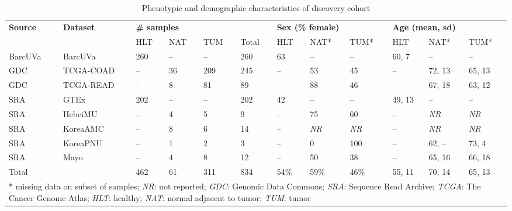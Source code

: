 \begin{table}[ht]
    \small
    \centering
    \caption{Phenotypic and demographic characteristics of discovery cohort}
    \label{tab:discovery}
    \begin{tabular}{ll|llll|lll|lll}
        \textbf{Source} & \textbf{Dataset} & \multicolumn{4}{l|}{\textbf{\# samples}} & \multicolumn{3}{l|}{\textbf{Sex (\% female)}} & \multicolumn{3}{l}{\textbf{Age (mean, sd)}} \\
        \cline{3-12}
         & & HLT & NAT & TUM & Total & HLT & NAT* & TUM* & HLT & NAT* & TUM* \\
        \hline
        BarcUVa & BarcUVa & 260 & -- & -- & 260 & 63 & -- & -- & 60, 7 & -- & -- \\
        GDC & TCGA-COAD & -- & 36 & 209 & 245 & -- & 53 & 45 & -- & 72, 13 & 65, 13 \\
        GDC & TCGA-READ & -- & 8 & 81 & 89 & -- & 88 & 46 & -- & 67, 18 & 63, 12 \\
        SRA & GTEx & 202 & -- & -- & 202 & 42 & -- & -- & 49, 13 & -- & -- \\
        SRA & HebeiMU & -- & 4 & 5 & 9 & -- & 75 & 60 & -- & \emph{NR} & \emph{NR} \\
        SRA & KoreaAMC & -- & 8 & 6 & 14 & -- & \emph{NR} & \emph{NR} & -- & \emph{NR} & \emph{NR} \\
        SRA & KoreaPNU & -- & 1 & 2 & 3 & -- & 0 & 100 & -- & 62, -- & 73, 4 \\
        SRA & Mayo & -- & 4 & 8 & 12 & -- & 50 & 38 & -- & 65, 16 & 66, 18 \\
        \hline
        Total &  & 462 & 61 & 311 & 834 & 54\% & 59\% & 46\% & 55, 11 & 70, 14 & 65, 13 \\
        \hline
        \multicolumn{12}{l}{* missing data on subset of samples; \emph{NR}: not reported; \emph{GDC}: Genomic Data Commons; \emph{SRA}: Sequence Read Archive; \emph{TCGA}: The Cancer Genome Atlas; \emph{HLT}: healthy; \emph{NAT}: normal adjacent to tumor; \emph{TUM}: tumor}
    \end{tabular}
\end{table}
